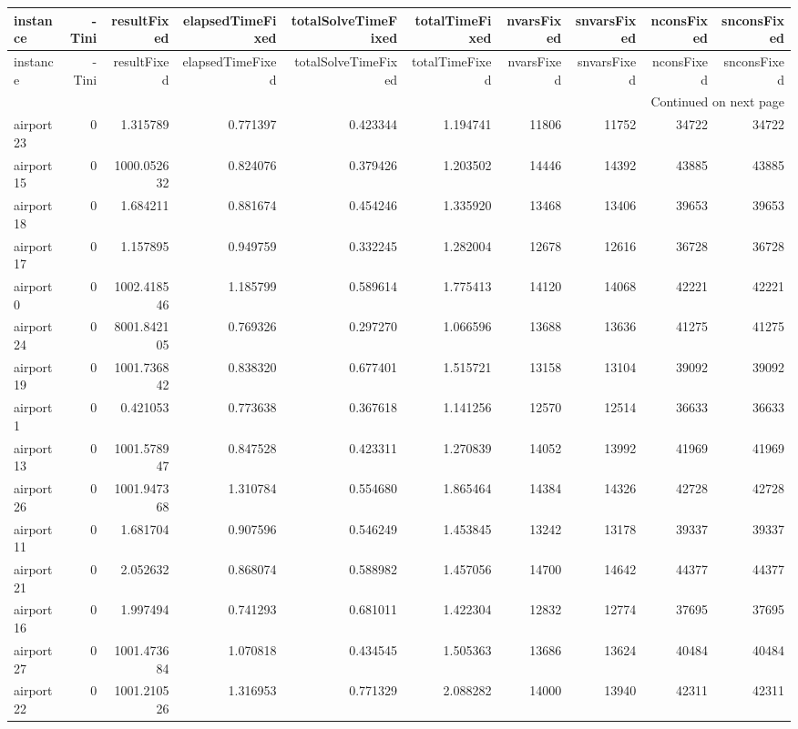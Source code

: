 
\begin{longtable}{|l|r|r|r|r|r|r|r|r|r|}
\toprule
instance & -Tini & resultFixed & elapsedTimeFixed & totalSolveTimeFixed & totalTimeFixed & nvarsFixed & snvarsFixed & nconsFixed & snconsFixed \\
\midrule
\endfirsthead
\toprule
instance & -Tini & resultFixed & elapsedTimeFixed & totalSolveTimeFixed & totalTimeFixed & nvarsFixed & snvarsFixed & nconsFixed & snconsFixed \\
\midrule
\endhead
\midrule
\multicolumn{10}{r}{Continued on next page} \\
\midrule
\endfoot
\bottomrule
\endlastfoot
airport23 & 0 & 1.315789 & 0.771397 & 0.423344 & 1.194741 & 11806 & 11752 & 34722 & 34722 \\
airport15 & 0 & 1000.052632 & 0.824076 & 0.379426 & 1.203502 & 14446 & 14392 & 43885 & 43885 \\
airport18 & 0 & 1.684211 & 0.881674 & 0.454246 & 1.335920 & 13468 & 13406 & 39653 & 39653 \\
airport17 & 0 & 1.157895 & 0.949759 & 0.332245 & 1.282004 & 12678 & 12616 & 36728 & 36728 \\
airport0 & 0 & 1002.418546 & 1.185799 & 0.589614 & 1.775413 & 14120 & 14068 & 42221 & 42221 \\
airport24 & 0 & 8001.842105 & 0.769326 & 0.297270 & 1.066596 & 13688 & 13636 & 41275 & 41275 \\
airport19 & 0 & 1001.736842 & 0.838320 & 0.677401 & 1.515721 & 13158 & 13104 & 39092 & 39092 \\
airport1 & 0 & 0.421053 & 0.773638 & 0.367618 & 1.141256 & 12570 & 12514 & 36633 & 36633 \\
airport13 & 0 & 1001.578947 & 0.847528 & 0.423311 & 1.270839 & 14052 & 13992 & 41969 & 41969 \\
airport26 & 0 & 1001.947368 & 1.310784 & 0.554680 & 1.865464 & 14384 & 14326 & 42728 & 42728 \\
airport11 & 0 & 1.681704 & 0.907596 & 0.546249 & 1.453845 & 13242 & 13178 & 39337 & 39337 \\
airport21 & 0 & 2.052632 & 0.868074 & 0.588982 & 1.457056 & 14700 & 14642 & 44377 & 44377 \\
airport16 & 0 & 1.997494 & 0.741293 & 0.681011 & 1.422304 & 12832 & 12774 & 37695 & 37695 \\
airport27 & 0 & 1001.473684 & 1.070818 & 0.434545 & 1.505363 & 13686 & 13624 & 40484 & 40484 \\
airport22 & 0 & 1001.210526 & 1.316953 & 0.771329 & 2.088282 & 14000 & 13940 & 42311 & 42311 \\

\end{longtable}
